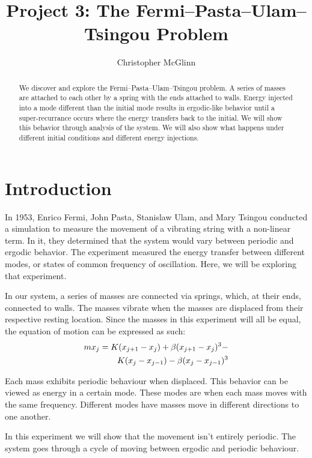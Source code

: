 \documentclass[pra,twocolumn,showpacs,amsmath,amssymb]{revtex4-2}
\begin{document}
\title{Project 3: The Fermi–Pasta–Ulam–Tsingou Problem}


\author{Christopher McGlinn}

\begin{abstract}
We discover and explore the Fermi–Pasta–Ulam–Tsingou problem. A series of masses are attached to each other by a spring with the ends attached to walls. Energy injected into a mode different than the initial mode results in ergodic-like behavior until a super-recurrance occurs where the energy transfers back to the initial. We will show this behavior through analysis of the system. We will also show what happens under different initial conditions and different energy injections.
\end{abstract}



\maketitle

\section{Introduction} \label{sec:intro}

In 1953, Enrico Fermi, John Pasta, Stanislaw Ulam, and Mary Tsingou conducted a simulation to measure the movement of a vibrating string with a non-linear term. In it, they determined that the system would vary between periodic and ergodic behavior. The experiment measured the energy transfer between different modes, or states of common frequency of oscillation. Here, we will be exploring that experiment.
\par In our system, a series of masses are connected via springs, which, at their ends, connected to walls. The masses vibrate when the masses are displaced from their respective resting location. Since the masses in this experiment will all be equal, the equation of motion can be expressed as such:
\begin{eqnarray}
mx_j = K(x_{j+1} - x_j) + \beta(x_{j+1} - x_j)^3 - \\
K(x_{j} - x_{j - 1}) - \beta(x_{j} - x_{j - 1})^3 \notag
\end{eqnarray}
\par Each mass exhibits periodic behaviour when displaced. This behavior can be viewed as energy in a certain mode. These modes are when each mass moves with the same frequency. Different modes have masses move in different directions to one another. 
\par In this experiment we will show that the movement isn't entirely periodic. The system goes through a cycle of moving between ergodic and periodic behaviour.
\end{document}
